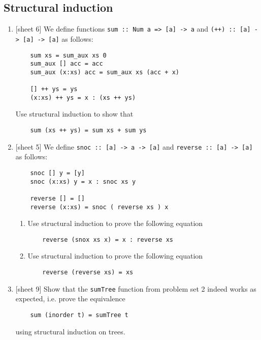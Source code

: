 \documentclass{article}
\def\code#1{\texttt{#1}}
\begin{document}
\subsection{Structural induction}
\begin{enumerate}
    \item {[sheet 6]} We define functions \code{sum :: Num a => [a] -> a} and \code{(++) :: [a] -> [a] -> [a]} as follows:
        \begin{verbatim}
    sum xs = sum_aux xs 0
    sum_aux [] acc = acc
    sum_aux (x:xs) acc = sum_aux xs (acc + x)

    [] ++ ys = ys
    (x:xs) ++ ys = x : (xs ++ ys)
        \end{verbatim}
        Use structural induction to show that
        \begin{verbatim}
    sum (xs ++ ys) = sum xs + sum ys
        \end{verbatim}

    \item {[sheet 5]} We define \code{snoc :: [a] -> a -> [a]} and \code{reverse :: [a] -> [a]} as follows:
        \begin{verbatim}
    snoc [] y = [y]
    snoc (x:xs) y = x : snoc xs y

    reverse [] = []
    reverse (x:xs) = snoc ( reverse xs ) x
        \end{verbatim}
        \begin{enumerate}
            \item Use structural induction to prove the following equation
                \begin{verbatim}
    reverse (snox xs x) = x : reverse xs
                \end{verbatim}
            \item Use structural induction to prove the following equation
                \begin{verbatim}
    reverse (reverse xs) = xs
                \end{verbatim}
        \end{enumerate}

    \item {[sheet 9]} Show that the \code{sumTree} function from problem set 2 indeed works as expected, i.e. prove the equivalence
        \begin{verbatim}
    sum (inorder t) = sumTree t
        \end{verbatim}
        using structural induction on trees.
\end{enumerate}
\end{document}
